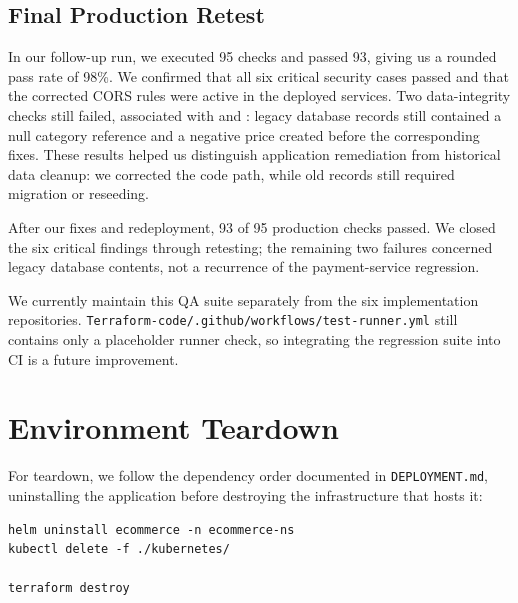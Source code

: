 \subsection*{Final Production Retest}
In our follow-up run, we executed 95 checks and passed 93, giving us a rounded
pass rate of 98\%. We confirmed that all six critical security cases passed and
that the corrected CORS rules were active in the deployed services. Two
data-integrity checks still failed, associated with  and
: legacy
database records still contained a null category reference and a negative price
created before the corresponding fixes. These results helped us distinguish application
remediation from historical data cleanup: we corrected the code path, while old
records still required migration or reseeding.

\begin{infobox}
After our fixes and redeployment, 93 of 95 production checks passed. We closed the
six critical findings through retesting; the remaining two failures concerned
legacy database contents, not a recurrence of the payment-service regression.
\end{infobox}

\newpage
We currently maintain this QA suite separately from the six implementation repositories.
\texttt{Terraform-\allowbreak code/\allowbreak .github/\allowbreak workflows/\allowbreak test-runner.yml} still contains only a
placeholder runner check, so integrating the regression suite into CI is a future
improvement.

\section{Environment Teardown}\label{sec:environment-teardown}
For teardown, we follow the dependency order documented in \texttt{DEPLOYMENT.md}, uninstalling the
application before destroying the infrastructure that hosts it:

\begin{lstlisting}[style=shellstyle, caption={Teardown sequence from DEPLOYMENT.md}]
helm uninstall ecommerce -n ecommerce-ns
kubectl delete -f ./kubernetes/

terraform destroy
\end{lstlisting}
